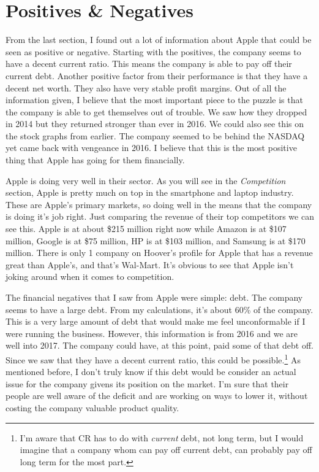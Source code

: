 \documentclass[12pt,a4paper,titlepage]{article}
\begin{document}
\newpage

\section{Positives \& Negatives}
From the last section, I found out a lot of information about Apple that could
be seen as positive or negative. Starting with the positives, the company seems
to have a decent current ratio. This means the company is able to pay off their
current debt. Another positive factor from their performance is that they have
a decent net worth. They also have very stable profit margins. Out of all the
information given, I believe that the most important piece to the puzzle is that
the company is able to get themselves out of trouble. We saw how they dropped in
2014 but they returned stronger than ever in 2016. We could also see this
on the stock graphs from earlier. The company seemed to be behind the NASDAQ yet
came back with vengeance in 2016. I believe that this is the most positive thing
that Apple has going for them financially.

Apple is doing very well in their sector. As you will see in the
\emph{Competition} section, Apple is pretty much on top in the smartphone and
laptop industry. These are Apple's primary markets, so doing well in the means
that the company is doing it's job right. Just comparing the revenue of their
top competitors we can see this. Apple is at about \$215 million right now while
Amazon is at \$107 million, Google is at \$75 million, HP is at \$103 million,
and Samsung is at \$170 million. There is only 1 company on Hoover's profile for
Apple that has a revenue great than Apple's, and that's Wal-Mart. It's obvious
to see that Apple isn't joking around when it comes to competition.

The financial negatives that I saw from Apple were simple: debt. The company
seems to have a large debt. From my calculations, it's about 60\% of the
company. This is a very large amount of debt that would make me feel
unconformable if I were running the business. However, this information is from
2016 and we are well into 2017. The company could have, at this point, paid some
of that debt off. Since we saw that they have a decent current ratio, this could
be possible.\footnote{I'm aware that CR has to do with \emph{current} debt, not
  long term, but I would imagine that a company whom can pay off current debt,
  can probably pay off long term for the most part.} As mentioned before, I
don't truly know if this debt would be consider an actual issue for the company
givens its position on the market. I'm sure that their people are well aware of
the deficit and are working on ways to lower it, without costing the company
valuable product quality.
\end{document}
